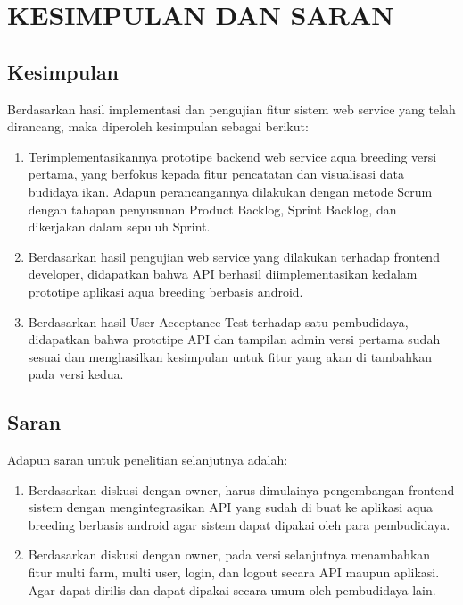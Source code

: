 
\chapter{KESIMPULAN DAN SARAN}

\section{Kesimpulan}
Berdasarkan hasil implementasi dan pengujian fitur sistem web service yang telah dirancang, maka diperoleh kesimpulan sebagai berikut:

\begin{enumerate}
	\item Terimplementasikannya prototipe backend web service aqua breeding versi pertama, yang berfokus kepada fitur pencatatan dan visualisasi data budidaya ikan. Adapun perancangannya dilakukan dengan metode Scrum dengan tahapan penyusunan Product Backlog, Sprint Backlog, dan dikerjakan dalam sepuluh Sprint.
	
	\item Berdasarkan hasil pengujian web service yang dilakukan terhadap frontend developer, didapatkan bahwa API berhasil diimplementasikan kedalam prototipe aplikasi aqua breeding berbasis android. 
	
	\item Berdasarkan hasil User Acceptance Test terhadap satu pembudidaya, didapatkan bahwa prototipe API dan tampilan admin versi pertama sudah sesuai dan menghasilkan kesimpulan untuk fitur yang akan di tambahkan pada versi kedua.
\end{enumerate}

\section{Saran}
Adapun saran untuk penelitian selanjutnya adalah:
\begin{enumerate} 
	\item Berdasarkan diskusi dengan owner, harus dimulainya pengembangan frontend sistem dengan mengintegrasikan API yang sudah di buat ke aplikasi aqua breeding berbasis android agar sistem dapat dipakai oleh para pembudidaya. 
	\item Berdasarkan diskusi dengan owner, pada versi selanjutnya menambahkan fitur multi farm, multi user, login, dan logout secara API maupun aplikasi. Agar dapat dirilis dan dapat dipakai secara umum oleh pembudidaya lain. 
\end{enumerate}


\begin{comment}

\end{comment}